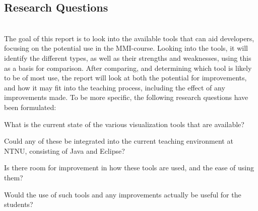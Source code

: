 \subsection{Research Questions}\label{intro-RQs}
~\\
The goal of this report is to look into the available tools that can aid developers, focusing on the potential use in the MMI-course.
Looking into the tools, it will identify the different types, as well as their strengths and weaknesses, using this as a basis for comparison.
After comparing, and determining which tool is likely to be of most use, the report will look at both the potential for improvements, and how it may fit into the teaching process, including the effect of any improvements made.
To be more specific, the following research questions have been formulated:
\begin{theorem}
What is the current state of the various visualization tools that are available?
\end{theorem}
\begin{theorem}
Could any of these be integrated into the current teaching environment at NTNU, consisting of Java and Eclipse?
\end{theorem}
\begin{theorem}
Is there room for improvement in how these tools are used, and the ease of using them?
\end{theorem}
\begin{theorem}
Would the use of such tools and any improvements actually be useful for the students?
\end{theorem}
